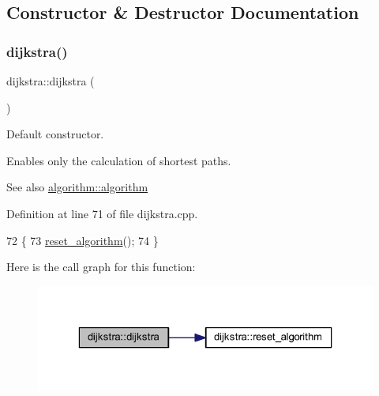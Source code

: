 \subsection{Constructor \& Destructor Documentation}
\mbox{\label{classdijkstra_a64a1fcb9cca32ff932b9b98a08cff106}} 
\subsubsection{\texorpdfstring{dijkstra()}{dijkstra()}}
{\footnotesize\ttfamily dijkstra\+::dijkstra (\begin{DoxyParamCaption}{ }\end{DoxyParamCaption})}



Default constructor. 

Enables only the calculation of shortest paths.

\begin{DoxySeeAlso}{See also}
\mbox{\hyperlink{classalgorithm_ab79e1ddec2f2afdf4b36b10724db8b15}{algorithm\+::algorithm}} 
\end{DoxySeeAlso}


Definition at line 71 of file dijkstra.\+cpp.


\begin{DoxyCode}
72 \{
73     \mbox{\hyperlink{classdijkstra_a70bec540a7f67970a9f19b60c5cbaedd}{reset\_algorithm}}();
74 \}
\end{DoxyCode}
Here is the call graph for this function\+:\nopagebreak
\begin{figure}[H]
\begin{center}
\leavevmode
\includegraphics[width=323pt]{classdijkstra_a64a1fcb9cca32ff932b9b98a08cff106_cgraph}
\end{center}
\end{figure}
\mbox{\label{classdijkstra_a871e3c8097b7f0bc17358473b1149515}} 
